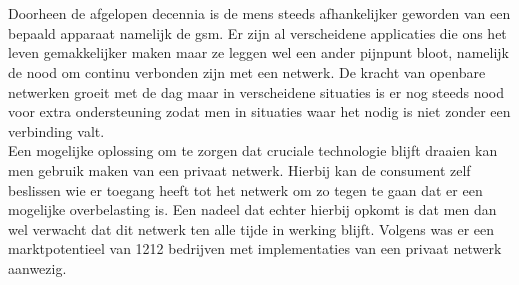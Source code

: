 
\chapter{}%
\label{ch:inleiding}

Doorheen de afgelopen decennia is de mens steeds afhankelijker geworden van een bepaald apparaat namelijk de gsm. Er zijn al verscheidene applicaties die ons het leven gemakkelijker maken maar ze leggen wel een ander pijnpunt bloot, namelijk de nood om continu verbonden zijn met een netwerk. De kracht van openbare netwerken groeit met de dag maar in verscheidene situaties is er nog steeds nood voor extra ondersteuning zodat men in situaties waar het nodig is niet zonder een verbinding valt. \\

Een mogelijke oplossing om te zorgen dat cruciale technologie blijft draaien kan men gebruik maken van een privaat netwerk. Hierbij kan de consument zelf beslissen wie er toegang heeft tot het netwerk om zo tegen te gaan dat er een mogelijke overbelasting is. Een nadeel dat echter hierbij opkomt is dat men dan wel verwacht dat dit netwerk ten alle tijde in werking blijft. Volgens \textcite{Dux2023} was er een marktpotentieel van 1212 bedrijven met implementaties van een privaat netwerk aanwezig. 
\section{}%
\label{sec:probleemstelling}


